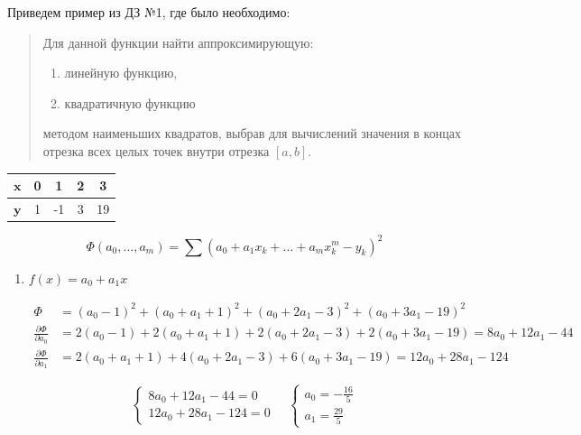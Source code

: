 \begin{example}
	Приведем пример из ДЗ №1, где было необходимо:
	\begin{quote}
		Для данной функции найти аппроксимирующую:
		\begin{enumerate}[label={\textbf{\alph*)}}, ref={\alph*}]
			\item линейную функцию,
			
			\item квадратичную функцию
		\end{enumerate}
		методом наименьших квадратов, выбрав для вычислений значения в концах отрезка всех целых точек внутри отрезка $[a, b]$.
	\end{quote} 
	
	
	\begin{table}[H]
		\centering
		\begin{tabular}{|c||c|c|c|c|}
			\hline 
			$\mathbf{x}$ & 0 & 1 & 2 & 3 \\ \hline 
			$\mathbf{y}$ & 1 & -1 & 3 & 19 \\ \hline 
		\end{tabular}
	\end{table}
	\begin{equation*}
		\Phi(a_0, \dotsc, a_m) = \sum (a_0 + a_1 x_k + \dotsc + a_m x^m_k - y_k)^2 
	\end{equation*}
	
	\begin{enumerate}[label=\textbf{{\alph*)}}, ref={\alph*}]
		\item $f(x) = a_0 + a_1 x$
		
		\begin{align*}
			\Phi &= (a_0 - 1)^2 + (a_0 + a_1 + 1)^2 + (a_0 + 2 a_1 - 3)^2 + (a_0 + 3 a_1 - 19)^2 \\
			\frac{\partial \Phi}{\partial a_0} &= 2 (a_0 - 1) + 2 (a_0 + a_1 + 1) + 2 (a_0 + 2 a_1 - 3) + 2 (a_0 + 3 a_1 - 19) = 8 a_0 + 12 a_1 - 44 \\
			\frac{\partial \Phi}{\partial a_1} &= 2 (a_0 + a_1 + 1) + 4 (a_0 + 2 a_1 - 3) + 6 (a_0 + 3 a_1 - 19) = 12 a_0 + 28 a_1 - 124 
		\end{align*}
		
		\begin{equation*}
			\begin{cases}
				8 a_0 + 12 a_1 - 44 = 0 \\
				12 a_0 + 28 a_1 - 124 = 0
			\end{cases} \quad 
			\begin{cases}
				a_0 = -\frac{16}{5} \\
				a_1 = \frac{29}{5} 
			\end{cases}
		\end{equation*}
		

\end{enumerate}
\end{example}
